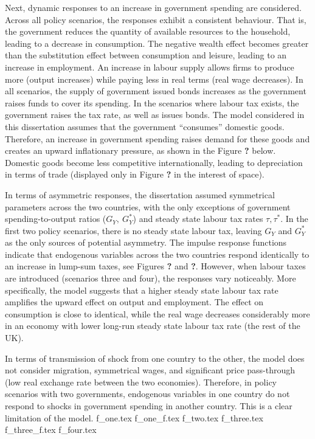 Next, dynamic responses to an increase in government spending are considered. Across all policy scenarios, the responses exhibit a consistent behaviour. That is, the government reduces the quantity of available resources to the household, leading to a decrease in consumption. The negative wealth effect becomes greater than the substitution effect between consumption and leisure, leading to an increase in employment. An increase in labour supply allows firms to produce more (output increases) while paying less in real terms (real wage decreases). In all scenarios, the supply of government issued bonds increases as the government raises funds to cover its spending. In the scenarios where labour tax exists, the government raises the tax rate, as well as issues bonds. The model considered in this dissertation assumes that the government ``consumes'' domestic goods. Therefore, an increase in government spending raises demand for these goods and creates an upward inflationary pressure, as shown in the Figure \textbf{?} below. Domestic goods become less competitive internationally, leading to depreciation in terms of trade (displayed only in Figure \textbf{?} in the interest of space). 

In terms of asymmetric responses, the dissertation assumed symmetrical parameters across the two countries, with the only exceptions of government spending-to-output ratios ($G_Y, \ G_Y^*$) and steady state labour tax rates $\tau, \tau^*$. In the first two policy scenarios, there is no steady state labour tax, leaving $G_Y$ and $G_Y^*$ as the only sources of potential asymmetry. The impulse response functions indicate that endogenous variables across the two countries respond identically to an increase in lump-sum taxes, see Figures \textbf{?} and \textbf{?}. However, when labour taxes are introduced (scenarios three and four), the responses vary noticeably. More specifically, the model suggests that a higher steady state labour tax rate amplifies the upward effect on output and employment. The effect on consumption is close to identical, while the real wage decreases considerably more in an economy with lower long-run steady state labour tax rate (the rest of the UK). 

In terms of transmission of shock from one country to the other, the model does not consider migration, symmetrical wages, and significant price pass-through (low real exchange rate between the two economies). Therefore, in policy scenarios with two governments, endogenous variables in one country do not respond to shocks in government spending in another country. This is a clear limitation of the model. 
{f_one.tex}
\newpage
{f_one_f.tex}
\newpage
\newpage
{f_two.tex}
\newpage
{f_three.tex}
\newpage
{f_three_f.tex}
\newpage
{f_four.tex}